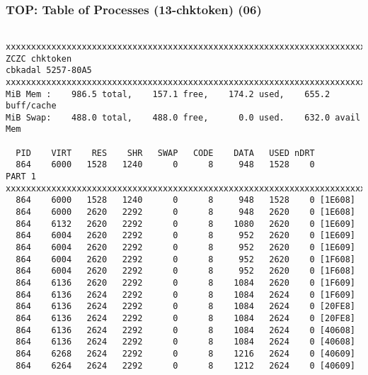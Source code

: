 \documentclass[xcolor=table, notheorems, hyperref={pdfpagelabels=false}]{beamer}
\begin{document}
\begin{frame}[fragile]
\frametitle{TOP: Table of Processes (13-chktoken) (06)}
\begin{lstlisting}[basicstyle=\ttfamily\tiny]

xxxxxxxxxxxxxxxxxxxxxxxxxxxxxxxxxxxxxxxxxxxxxxxxxxxxxxxxxxxxxxxxxxxxxxxxxxx
ZCZC chktoken
cbkadal 5257-80A5
xxxxxxxxxxxxxxxxxxxxxxxxxxxxxxxxxxxxxxxxxxxxxxxxxxxxxxxxxxxxxxxxxxxxxxxxxxx
MiB Mem :    986.5 total,    157.1 free,    174.2 used,    655.2 buff/cache
MiB Swap:    488.0 total,    488.0 free,      0.0 used.    632.0 avail Mem 

  PID    VIRT    RES    SHR   SWAP   CODE    DATA   USED nDRT
  864    6000   1528   1240      0      8     948   1528    0
PART 1
xxxxxxxxxxxxxxxxxxxxxxxxxxxxxxxxxxxxxxxxxxxxxxxxxxxxxxxxxxxxxxxxxxxxxxxxxxx
  864    6000   1528   1240      0      8     948   1528    0 [1E608]
  864    6000   2620   2292      0      8     948   2620    0 [1E608]
  864    6132   2620   2292      0      8    1080   2620    0 [1E609]
  864    6004   2620   2292      0      8     952   2620    0 [1E609]
  864    6004   2620   2292      0      8     952   2620    0 [1E609]
  864    6004   2620   2292      0      8     952   2620    0 [1F608]
  864    6004   2620   2292      0      8     952   2620    0 [1F608]
  864    6136   2620   2292      0      8    1084   2620    0 [1F609]
  864    6136   2624   2292      0      8    1084   2624    0 [1F609]
  864    6136   2624   2292      0      8    1084   2624    0 [20FE8]
  864    6136   2624   2292      0      8    1084   2624    0 [20FE8]
  864    6136   2624   2292      0      8    1084   2624    0 [40608]
  864    6136   2624   2292      0      8    1084   2624    0 [40608]
  864    6268   2624   2292      0      8    1216   2624    0 [40609]
  864    6264   2624   2292      0      8    1212   2624    0 [40609]

\end{lstlisting}
\end{frame}
\end{document}
